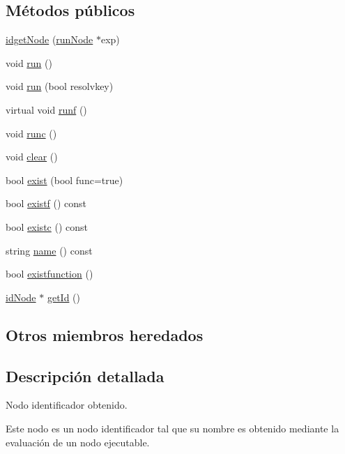 \subsection*{Métodos públicos}
\begin{DoxyCompactItemize}
\item 
\hyperlink{classidgetNode_a3e222fd67271c678e2aad6297b29ef88}{idget\-Node} (\hyperlink{classrunNode}{run\-Node} $\ast$exp)
\item 
void \hyperlink{classidgetNode_a9423b08e0755a0432b47dde32e7c473f}{run} ()
\item 
void \hyperlink{classidgetNode_a5064c05a1e080cf66fbc754b2f76f111}{run} (bool resolvkey)
\item 
virtual void \hyperlink{classidgetNode_a116329895e687e16356ee3aba892fc04}{runf} ()
\item 
void \hyperlink{classidgetNode_a6f3d7453fa18e1faba1b1ba06492096f}{runc} ()
\item 
void \hyperlink{classidgetNode_ab399b394c1f81f725bdf6cd315577a41}{clear} ()
\item 
bool \hyperlink{classidgetNode_ab17484e81265f876d0fd2babf2186765}{exist} (bool func=true)
\item 
bool \hyperlink{classidgetNode_a2f92ff2c5c01a90bd05764182a8c5e9d}{existf} () const 
\item 
bool \hyperlink{classidgetNode_a17a0ea08ac721346d46db409dd5d894e}{existc} () const 
\item 
string \hyperlink{classidgetNode_a49f8984f744fec5f136bab98246a8890}{name} () const 
\item 
bool \hyperlink{classidgetNode_a26c065b2595bfebe90106db2c2e45643}{existfunction} ()
\item 
\hyperlink{classidNode}{id\-Node} $\ast$ \hyperlink{classidgetNode_af71a95561ebcc1869a78db7bcdfb026d}{get\-Id} ()
\end{DoxyCompactItemize}
\subsection*{Otros miembros heredados}


\subsection{Descripción detallada}
Nodo identificador obtenido. 

Este nodo es un nodo identificador tal que su nombre es obtenido mediante la evaluación de un nodo ejecutable.

